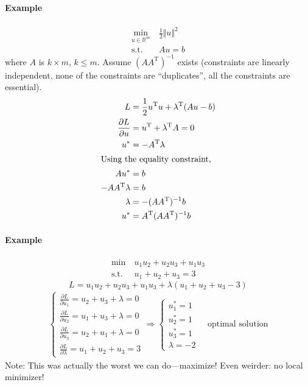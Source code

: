 \documentclass[letterpaper,12pt,titlepage]{report}
\newcommand{\trans}{^\text{T}}
\newcommand*\pder[2]{\frac{\partial #1}{\partial #2}}
\newcommand*\R{\mathbb{R}}
\theoremstyle{plain}
\theoremstyle{definition}
\begin{document}
\paragraph{Example}
\begin{align}
  \min_{u\in\R^m} {}\ & \frac12 \Vert u\Vert^2 \\
  \text{s.t. } & Au=b
\end{align}
where $A$ is $k\times m$, $k\le m$. Assume $(AA\trans)^{-1}$ exists (constraints are linearly independent, none of the constraints are ``duplicates'', all the constraints are essential).
\begin{align}
  L &= \frac12 u\trans u + \lambda\trans (Au-b) \\
  \pder{L}{u} &= u\trans + \lambda\trans A = 0 \\
  u^* &= -A\trans \lambda \\
  \shortintertext{Using the equality constraint,}
  A u^* &= b \\
  -A A\trans \lambda &= b \\
  \lambda &= -(AA\trans)^{-1} b \\
  u^* &= A\trans (AA\trans)^{-1} b
\end{align}

\paragraph{Example}
\begin{align}
  \min {}\ & u_1u_2 + u_2u_3 + u_1u_3 \\
  \text{s.t. } & u_1 + u_2 + u_3 = 3
\end{align}
\[ L = u_1u_2 + u_2u_3 + u_1u_3 + \lambda (u_1 + u_2 + u_3 - 3) \]
\begin{align}
  \begin{cases}
    \pder{L}{u_1} = u_2 + u_3 + \lambda = 0 \\
    \pder{L}{u_2} = u_1 + u_3 + \lambda = 0 \\
    \pder{L}{u_3} = u_2 + u_1 + \lambda = 0 \\
    \pder{L}{\lambda} = u_1 + u_2 + u_3 = 3
  \end{cases}
  \Longrightarrow
  \begin{cases}
    u_1^* = 1 \\
    u_2^* = 1 \\
    u_3^* = 1 \\
    \lambda = -2
  \end{cases}
  \quad \text{optimal solution}
\end{align}
Note: This was actually the worst we can do---maximize! Even weirder: no local minimizer!
\end{document}
